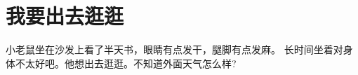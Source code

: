 \chapter{我要出去逛逛}



{\linespread{1.5}\fontsize{18}{18}\selectfont
\vspace*{2cm}
小老鼠坐在沙发上看了半天书，眼睛有点发干，腿脚有点发麻。
长时间坐着对身体不太好吧。他想出去逛逛。不知道外面天气怎么样?\par
}
\ClearShipoutPicture

